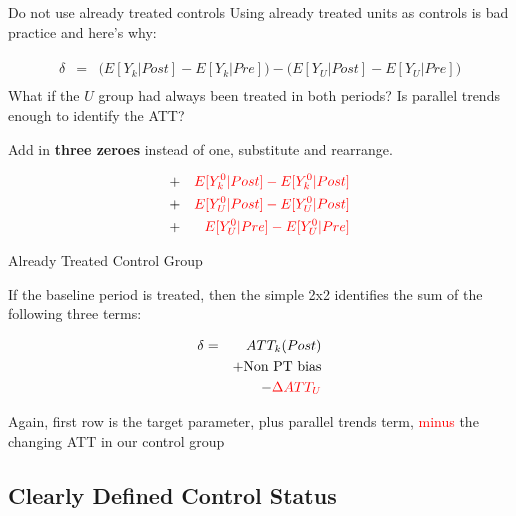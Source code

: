 \documentclass{beamer}
\begin{document}
\begin{frame}{Do not use already treated controls}
Using already treated units as controls is bad practice and here's why:

\begin{eqnarray*}
\widehat{\delta} &=& \bigg ( E[Y_k|Post] - E[Y_k|Pre] \bigg ) - \bigg ( E[Y_U | Post ] - E[ Y_U | Pre] \bigg) \\
\end{eqnarray*}What if the $U$ group had always been treated in both periods? Is parallel trends enough to identify the ATT?

\bigskip

Add in \textbf{three zeroes} instead of one, substitute and rearrange.

\begin{eqnarray*}
&+& \textcolor{red}{E[Y^0_k|Post] - E[Y^0_k|Post]} \\
&+& \textcolor{red}{E[Y^0_U|Post] - E[Y^0_U|Post]}  \\
&+& \textcolor{red}{E[Y^0_U|Pre] - E[Y^0_U|Pre]}
\end{eqnarray*}

\end{frame}

\begin{frame}{Already Treated Control Group}

If the baseline period is treated, then the simple 2x2 identifies the sum of the following three terms:

\begin{eqnarray*}
\delta &=& ATT_k(Post) \\&&+ \text{Non PT bias} \\&&- \textcolor{red}{\Delta ATT_U}
\end{eqnarray*}

Again, first row is the target parameter, plus parallel trends term, \textcolor{red}{minus} the changing ATT in our control group

\end{frame}

\subsection{Clearly Defined Control Status}
\end{document}
